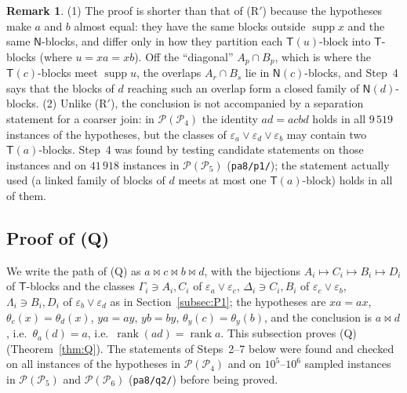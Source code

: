 \documentclass[11pt]{amsart}
\theoremstyle{definition}
\newtheorem{remark}[theorem]{Remark}
\renewcommand{\P}{\mathcal{P}}
\newcommand{\supp}{\operatorname{supp}}
\newcommand{\T}{\mathsf{T}}
\newcommand{\N}{\mathsf{N}}
\newcommand{\rk}{\operatorname{rank}}
\newcommand{\mt}{\bowtie}   %
\begin{document}
\begin{remark}\label{rem:P1}
(1) The proof is shorter than that of (R$'$) because the hypotheses make $a$ and $b$ almost equal: they have the same blocks outside $\supp x$ and the same $\N$-blocks, and differ only in how they partition each $\T(u)$-block into $\T$-blocks (where $u=xa=xb$). Off the ``diagonal'' $A_p\cap B_p$, which is where the $\T(c)$-blocks meet $\supp u$, the overlaps $A_r\cap B_s$ lie in $\N(c)$-blocks, and Step~4 says that the blocks of $d$ reaching such an overlap form a closed family of $\N(d)$-blocks. (2) Unlike (R$'$), the conclusion is not accompanied by a separation statement for a coarser join: in $\P(\P_4)$ the identity $ad=acbd$ holds in all $9\,519$ instances of the hypotheses, but the classes of $\varepsilon_a\vee\varepsilon_d\vee\varepsilon_b$ may contain two $\T(a)$-blocks. Step~4 was found by testing candidate statements on those instances and on $41\,918$ instances in $\P(\P_5)$ (\texttt{pa8/p1/}); the statement actually used (a linked family of blocks of $d$ meets at most one $\T(a)$-block) holds in all of them.
\end{remark}

\subsection{Proof of (Q)}\label{subsec:Q}

We write the path of (Q) as $a\mt c\mt b\mt d$, with the bijections $A_i\mapsto C_i\mapsto B_i\mapsto D_i$ of $\T$-blocks and the classes $\Gamma_i\ni A_i,C_i$ of $\varepsilon_a\vee\varepsilon_c$, $\Delta_i\ni C_i,B_i$ of $\varepsilon_c\vee\varepsilon_b$, $\Lambda_i\ni B_i,D_i$ of $\varepsilon_b\vee\varepsilon_d$ as in Section~\ref{subsec:P1}; the hypotheses are $xa=ax$, $\theta_c(x)=\theta_d(x)$, $ya=ay$, $yb=by$, $\theta_y(c)=\theta_y(b)$, and the conclusion is $a\mt d$, i.e.\ $\theta_a(d)=a$, i.e.\ $\rk(ad)=\rk a$. This subsection proves (Q) (Theorem~\ref{thm:Q}). The statements of Steps~2--7 below were found and checked on all instances of the hypotheses in $\P(\P_4)$ and on $10^5$--$10^6$ sampled instances in $\P(\P_5)$ and $\P(\P_6)$ (\texttt{pa8/q2/}) before being proved.
\end{document}
